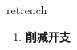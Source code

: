 
\begin{frame}
{\huge retrench}
\begin{center}
\begin{enumerate}\Large
  \item \textbf{削减开支}
\end{enumerate}
\end{center}
\end{frame}

